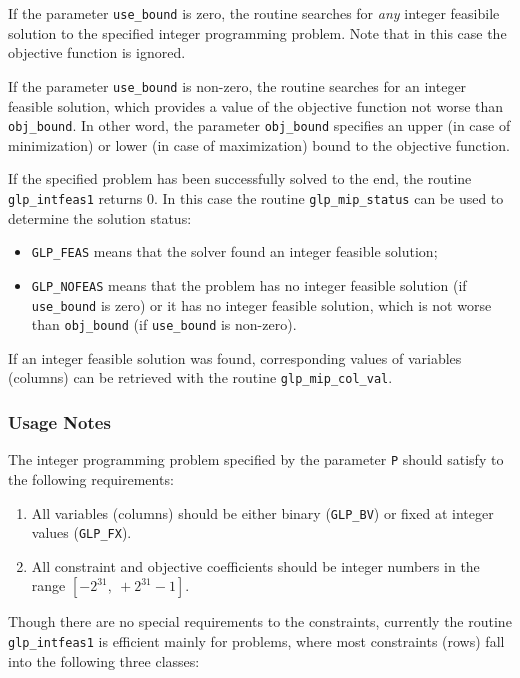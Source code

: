 \documentclass[11pt,draft]{article}
\begin{document}
If the parameter \verb|use_bound| is zero, the routine searches for
{\it any} integer feasibile solution to the specified integer
programming problem. Note that in this case the objective function is
ignored.

If the parameter \verb|use_bound| is non-zero, the routine searches for
an integer feasible solution, which provides a value of the objective
function not worse than \verb|obj_bound|. In other word, the parameter
\verb|obj_bound| specifies an upper (in case of minimization) or lower
(in case of maximization) bound to the objective function.

If the specified problem has been successfully solved to the end, the
routine \verb|glp_intfeas1| returns 0. In this case the routine
\verb|glp_mip_status| can be used to determine the solution status:

\begin{itemize}
\item {\tt GLP\_FEAS} means that the solver found an integer feasible
solution;

\item {\tt GLP\_NOFEAS} means that the problem has no integer feasible
solution (if {\tt use\_bound} is zero) or it has no integer feasible
solution, which is not worse than {\tt obj\_bound} (if {\tt use\_bound}
is non-zero).
\end{itemize}

If an integer feasible solution was found, corresponding values of
variables (columns) can be retrieved with the routine
\verb|glp_mip_col_val|.

\subsubsection*{Usage Notes}

The integer programming problem specified by the parameter \verb|P|
should satisfy to the following requirements:

\begin{enumerate}
\item All variables (columns) should be either binary ({\tt GLP\_BV})
or fixed at integer values ({\tt GLP\_FX}).

\item All constraint and objective coefficients should be integer
numbers in the range $[-2^{31},\ +2^{31}-1]$.
\end{enumerate}

Though there are no special requirements to the constraints,
currently the routine \verb|glp_intfeas1| is efficient mainly for
problems, where most constraints (rows) fall into the following three
classes:
\end{document}
